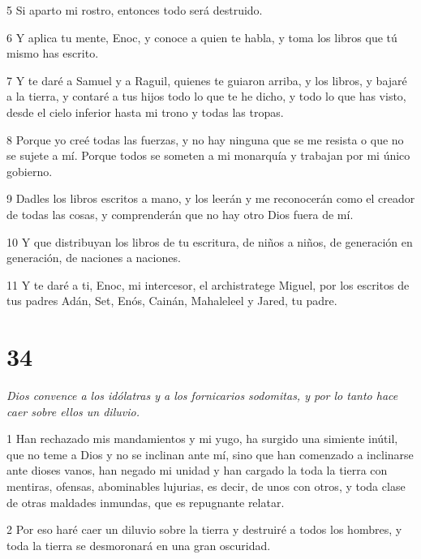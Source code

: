 \par 5 Si aparto mi rostro, entonces todo será destruido.

\par 6 Y aplica tu mente, Enoc, y conoce a quien te habla, y toma los libros que tú mismo has escrito.

\par 7 Y te daré a Samuel y a Raguil, quienes te guiaron arriba, y los libros, y bajaré a la tierra, y contaré a tus hijos todo lo que te he dicho, y todo lo que has visto, desde el cielo inferior hasta mi trono y todas las tropas.

\par 8 Porque yo creé todas las fuerzas, y no hay ninguna que se me resista o que no se sujete a mí. Porque todos se someten a mi monarquía y trabajan por mi único gobierno.

\par 9 Dadles los libros escritos a mano, y los leerán y me reconocerán como el creador de todas las cosas, y comprenderán que no hay otro Dios fuera de mí.

\par 10 Y que distribuyan los libros de tu escritura, de niños a niños, de generación en generación, de naciones a naciones.

\par 11 Y te daré a ti, Enoc, mi intercesor, el archistratege Miguel, por los escritos de tus padres Adán, Set, Enós, Cainán, Mahaleleel y Jared, tu padre.

\chapter{34}

\par \textit{Dios convence a los idólatras y a los fornicarios sodomitas, y por lo tanto hace caer sobre ellos un diluvio.}

\par 1 Han rechazado mis mandamientos y mi yugo, ha surgido una simiente inútil, que no teme a Dios y no se inclinan ante mí, sino que han comenzado a inclinarse ante dioses vanos, han negado mi unidad y han cargado la toda la tierra con mentiras, ofensas, abominables lujurias, es decir, de unos con otros, y toda clase de otras maldades inmundas, que es repugnante relatar.

\par 2 Por eso haré caer un diluvio sobre la tierra y destruiré a todos los hombres, y toda la tierra se desmoronará en una gran oscuridad.

